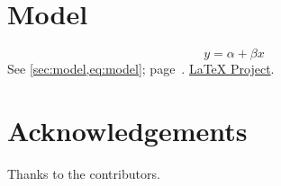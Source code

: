 \documentclass[11pt]{article}
\begin{document}
\tableofcontents
\section{Model}\label{sec:model}
\begin{equation}\label{eq:model}y=\alpha+\beta x\end{equation}
See \cref{sec:model,eq:model}; page~\pageref{eq:model}.
\href{https://www.latex-project.org/}{LaTeX Project}.
\section*{Acknowledgements}
Thanks to the contributors.
\end{document}
